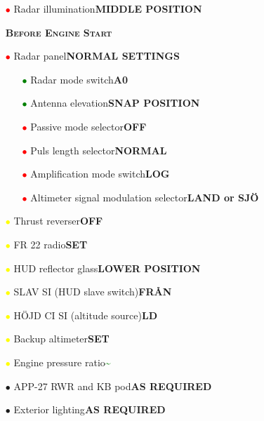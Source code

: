 \documentclass[a4paper,12pt,dvipsnames]{letter}
\newcommand{\button}[1]{\textbf{#1}}
\newcommand{\ok}[1]{\textcolor{Green}{\textbf{#1}}}
\newcommand{\myHead}[1]{{\LARGE\textsc{\textbf{#1}}}}
\newcommand{\bi}{\textcolor{ProcessBlue}{$\bullet$\;}}
\newcommand{\ri}{\textcolor{red}{$\bullet$\;}}
\newcommand{\gi}{\textcolor{Green}{$\bullet$\;}}
\newcommand{\yi}{\textcolor{Yellow}{$\bullet$\;}}
\newcommand{\vi}{\textcolor{Plum}{$\bullet$\;}}
\begin{document}
{\begin{itemize}
\begin{itemize}
\begin{itemize}
  \end{itemize}
  \item[\ri] KONTR LAMPTABL\AA{} (warning panel test) button\dotfill\button{RELEASE}
  \begin{itemize}
   \item[\vi] Lights marked white\dotfill\ok{REMAIN ON}
  \end{itemize}
 \end{itemize}
 \item[\ri] Radar illumination\dotfill\button{MIDDLE POSITION}
  \end{itemize}
\newpage %
\begin{itemize}
 \item[] \myHead{Before Engine Start}
 \item[\ri] Radar panel\dotfill\button{NORMAL SETTINGS}
 \begin{itemize}
  \item[\gi] Radar mode switch\dotfill\button{A0}
  \item[\gi] Antenna elevation\dotfill\button{SNAP POSITION}
  \item[\ri] Passive mode selector\dotfill\button{OFF}
  \item[\ri] Puls length selector\dotfill\button{NORMAL}
  \item[\ri] Amplification mode switch\dotfill\button{LOG}
  \item[\ri] Altimeter signal modulation selector\dotfill\button{LAND or SJÖ}
 \end{itemize}
 \item[\yi] Thrust reverser\dotfill\button{OFF}
 \item[\yi] FR 22 radio\dotfill\button{SET}
 \item[\yi] HUD reflector glass\dotfill\button{LOWER POSITION}
 \item[\yi] SLAV SI (HUD slave switch)\dotfill\button{FR\AA N}
 \item[\yi] HÖJD CI SI (altitude source)\dotfill\button{LD}
 \item[\yi] Backup altimeter\dotfill\button{SET}
 \item[\yi] Engine pressure ratio\dotfill\ok{\textasciitilde{}}
 \item[\bi] APP-27 RWR and KB pod\dotfill\button{AS REQUIRED}
 \item[\bi] Exterior lighting\dotfill\button{AS REQUIRED}

\end{itemize}}
\end{document}
